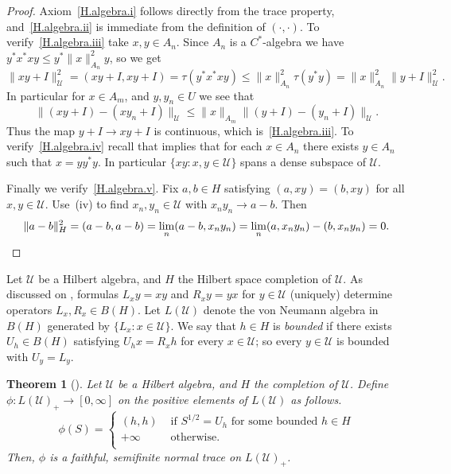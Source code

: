 \documentclass[a4paper, 12pt]{amsart}
\numberwithin{equation}{section}
\newcounter{theorem}
\newtheorem{thm}[theorem]{Theorem}
\theoremstyle{remark}
\theoremstyle{definition}
\begin{document}
\begin{proof}
Axiom~\eqref{H.algebra.i} follows directly from the trace property, and~\eqref{H.algebra.ii} is immediate from the
definition of $(\cdot, \cdot)$. To verify~\eqref{H.algebra.iii} take $x,y\in A_n$. Since $A_n$ is a
$C^*$-algebra we have $y^*x^*xy\leq y^*\|x\|_{A_n}^2y$, so we get
\[
\|xy+I\|^2_{\mathcal{U}}
    =(xy+I,xy+I)
    =\tau(y^*x^*xy)\leq\|x\|_{A_n}^2\tau(y^*y)
    =\|x\|_{A_n}^2\|y+I\|_{\mathcal{U}}^2.
\]
In particular for $x\in A_m$, and $y,y_n\in U$ we see that
$$\|(xy+I)-(xy_n+I)\|_{\mathcal{U}}\leq \|x\|_{A_m}\|(y+I)-(y_n+I)\|_{\mathcal{U}}.$$
Thus the map $y+I\to xy+I$ is continuous, which is~\eqref{H.algebra.iii}. To verify~\eqref{H.algebra.iv} recall that
\cite[II.3.2.3]{MR2188261} implies that for each $x\in A_n$ there exists $y\in A_n$  such
that $x=yy^*y$. In particular $\{xy : x,y\in{\mathcal{U}}\}$ spans a dense subspace of ${\mathcal{U}}$.

Finally we verify~\eqref{H.algebra.v}. Fix $a,b\in H$ satisfying $(a,xy)=(b,xy)$ for all $x,y\in
{\mathcal{U}}$. Use~(iv) to find $x_n, y_n \in {\mathcal{U}}$ with $x_ny_n \to a-b$. Then
\[
\|a-b\|_H^2
    = (a-b, a-b)
    =\lim_n (a-b, x_ny_n)
    = \lim_n (a, x_ny_n) - (b, x_ny_n)
    = 0.\qedhere
\]
\end{proof}

Let ${\mathcal{U}}$ be a Hilbert algebra, and $H$ the Hilbert space completion of ${\mathcal{U}}$. As
discussed on \cite[p.~78]{MR641217}, formulas $L_x y = xy$ and $R_x y = yx$ for $y \in {\mathcal{U}}$
(uniquely) determine operators $L_x, R_x \in B(H)$. Let $L({\mathcal{U}})$ denote
the von Neumann algebra in $B(H)$ generated by $\{L_x: x\in {\mathcal{U}}\}$. We say that $h \in H$
is \emph{bounded} if there exists $U_h \in B(H)$ satisfying $U_h x = R_x h$ for every
$x\in {\mathcal{U}}$; so every $y \in {\mathcal{U}}$ is bounded with $U_y = L_y$.

\begin{thm}[{\cite[Theorem~1, p.~97]{MR641217}}]\label{thm.Dix}
Let ${\mathcal{U}}$ be a Hilbert algebra, and $H$ the completion of ${\mathcal{U}}$. Define
$\phi\colon L({\mathcal{U}})_+\to [0,\infty]$ on the positive elements of $L({\mathcal{U}})$ as follows.
\begin{equation*}\label{xn}
\phi(S)=\left\{
\begin{array}{ll}
(h,h)&\mbox{ if } S^{1/2}=U_h\mbox{ for some bounded }h\in H\\
+\infty&\mbox{ otherwise. }\\
\end{array}\right.
\end{equation*}
Then, $\phi$ is a faithful, semifinite normal trace on $L({\mathcal{U}})_+$.
\end{thm}
\end{document}

